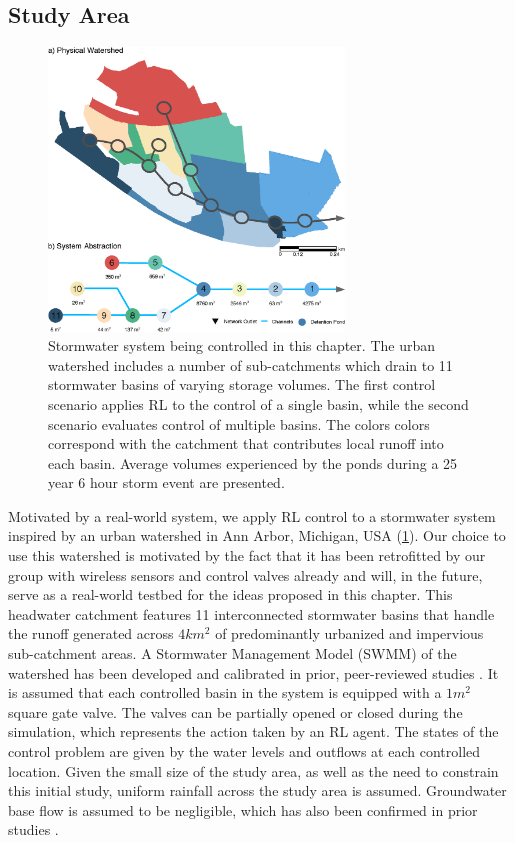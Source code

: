 \subsection{Study Area}
\begin{figure}
    \centering
    \includegraphics[width=0.7\textwidth]{gfx/Chapter-3/casestudy_fig_2.eps}
    \caption{Stormwater system being controlled in this chapter. The urban watershed includes a number of sub-catchments which drain to 11 stormwater basins of varying storage volumes. The first control scenario applies RL to the control of a single basin, while the second scenario evaluates control of multiple basins. The colors colors correspond with the catchment that contributes local runoff into each basin. Average volumes experienced by the ponds during a 25 year 6 hour storm event are presented.}\label{fig:2}
\end{figure}

Motivated by a real-world system, we apply RL control to a stormwater system inspired by an urban watershed in Ann Arbor, Michigan, USA (\ref{fig:2}). Our choice to use this watershed is motivated by the fact that it has been retrofitted by our group with wireless sensors and control valves already \cite{Bartos_2018} and will, in the future, serve as a real-world testbed for the ideas proposed in this chapter. This headwater catchment features 11 interconnected stormwater basins that handle the runoff generated across $4km^2$   of predominantly urbanized and impervious sub-catchment areas.   A Stormwater Management Model (SWMM) of the watershed has been developed and calibrated in prior, peer-reviewed studies \cite{wong2018real}. It is assumed that each controlled basin in the system is equipped with a $1m^2$ square gate valve. The valves can be partially opened or closed during the simulation, which represents the action taken by an RL agent. The states of the control problem are given by the water levels and outflows at each controlled location. Given the small size of the study area, as well as the need to constrain this initial study, uniform rainfall across the study area is assumed. Groundwater base flow is assumed to be negligible, which has also been confirmed in prior studies \cite{wong2018real}.

